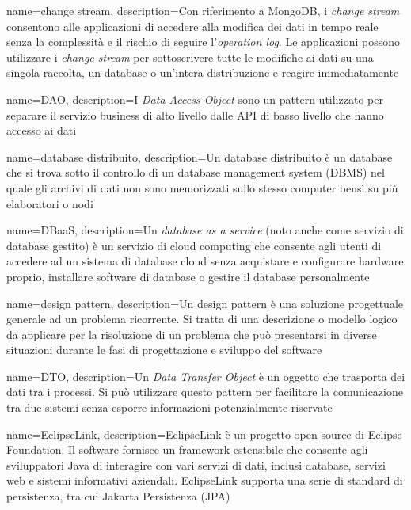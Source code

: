 

{
    name=change stream,
    description={Con riferimento a MongoDB, i \textit{change stream} consentono alle applicazioni di accedere alla modifica dei dati in tempo reale senza la complessità e il rischio di seguire l'\textit{operation log}. Le applicazioni possono utilizzare i \textit{change stream} per sottoscrivere tutte le modifiche ai dati su una singola raccolta, un database o un'intera distribuzione e reagire immediatamente}
}

{
    name=DAO,
    description={I \textit{Data Access Object} sono un pattern utilizzato per separare il servizio business di alto livello dalle API di basso livello che hanno accesso ai dati}
}

{
    name=database distribuito,
    description={Un database distribuito è un database che si trova sotto il controllo di un database management system (DBMS) nel quale gli archivi di dati non sono memorizzati sullo stesso computer bensì su più elaboratori o nodi}
}

{
    name=DBaaS,
    description={Un \textit{database as a service} (noto anche come servizio di database gestito) è un servizio di cloud computing che consente agli utenti di accedere ad un sistema di database cloud senza acquistare e configurare hardware proprio, installare software di database o gestire il database personalmente}
}

{
    name=design pattern,
    description={Un design pattern è una soluzione progettuale generale ad un problema ricorrente. Si tratta di una descrizione o modello logico da applicare per la risoluzione di un problema che può presentarsi in diverse situazioni durante le fasi di progettazione e sviluppo del software}
}

{
    name=DTO,
    description={Un \textit{Data Transfer Object} è un oggetto che trasporta dei dati tra i processi. Si può utilizzare questo pattern per facilitare la comunicazione tra due sistemi senza esporre informazioni potenzialmente riservate}
}

{
    name=EclipseLink,
    description={EclipseLink è un progetto open source di Eclipse Foundation. Il software fornisce un framework estensibile che consente agli sviluppatori Java di interagire con vari servizi di dati, inclusi database, servizi web e sistemi informativi aziendali. EclipseLink supporta una serie di standard di persistenza, tra cui Jakarta Persistenza (JPA)}
}



